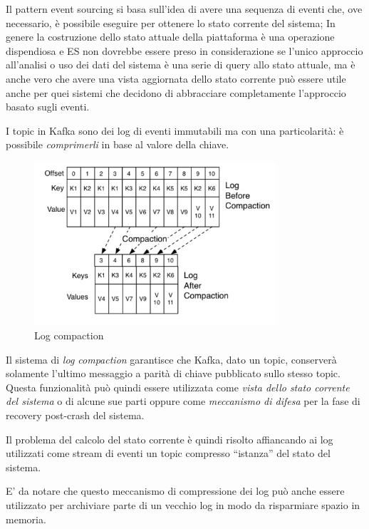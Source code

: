 \documentclass[]{article}
\begin{document}
Il pattern event sourcing si basa sull'idea di avere una sequenza di
eventi che, ove necessario, è possibile eseguire per ottenere lo stato
corrente del sistema; In genere la costruzione dello stato attuale della
piattaforma è una operazione dispendiosa e ES non dovrebbe essere preso
in considerazione se l'unico approccio all'analisi o uso dei dati del
sistema è una serie di query allo stato attuale, ma è anche vero che
avere una vista aggiornata dello stato corrente può essere utile anche
per quei sistemi che decidono di abbracciare completamente l'approccio
basato sugli eventi.

I topic in Kafka sono dei log di eventi immutabili ma con una
particolarità: è possibile \emph{comprimerli} in base al valore della
chiave.

\begin{figure}
\centering
\includegraphics[width=0.80000\textwidth]{../images/log-compaction.png}
\caption{Log compaction \label{figure_5}}
\end{figure}

Il sistema di \emph{log compaction} garantisce che Kafka, dato un topic,
conserverà solamente l'ultimo messaggio a parità di chiave pubblicato
sullo stesso topic.\\
Questa funzionalità può quindi essere utilizzata come \emph{vista dello
stato corrente del sistema} o di alcune sue parti oppure come
\emph{meccanismo di difesa} per la fase di recovery post-crash del
sistema.

Il problema del calcolo del stato corrente è quindi risolto affiancando
ai log utilizzati come stream di eventi un topic compresso ``istanza''
del stato del sistema.

E' da notare che questo meccanismo di compressione dei log può anche
essere utilizzato per archiviare parte di un vecchio log in modo da
risparmiare spazio in memoria.
\end{document}

